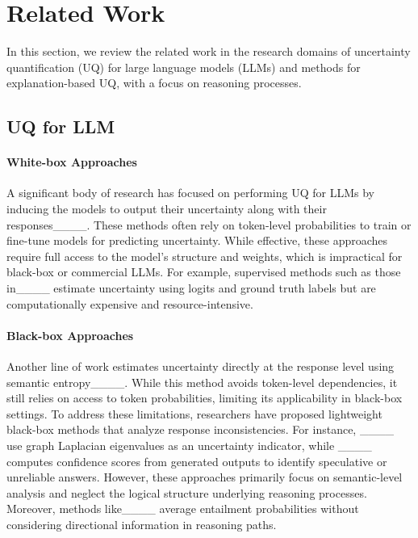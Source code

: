 \section{Related Work}

In this section, we review the related work in the research domains of uncertainty quantification (UQ) for large language models (LLMs) and methods for explanation-based UQ, with a focus on reasoning processes.



\subsection{UQ for LLM}

\paragraph{White-box Approaches} A significant body of research has focused on performing UQ for LLMs by inducing the models to output their uncertainty along with their responses____. These methods often rely on token-level probabilities to train or fine-tune models for predicting uncertainty. While effective, these approaches require full access to the model's structure and weights, which is impractical for black-box or commercial LLMs. For example, supervised methods such as those in____ estimate uncertainty using logits and ground truth labels but are computationally expensive and resource-intensive.
\paragraph{Black-box Approaches} Another line of work estimates uncertainty directly at the response level using semantic entropy____. While this method avoids token-level dependencies, it still relies on access to token probabilities, limiting its applicability in black-box settings. To address these limitations, researchers have proposed lightweight black-box methods that analyze response inconsistencies. For instance, ____ use graph Laplacian eigenvalues as an uncertainty indicator, while ____ computes confidence scores from generated outputs to identify speculative or unreliable answers. However, these approaches primarily focus on semantic-level analysis and neglect the logical structure underlying reasoning processes. Moreover, methods like____ average entailment probabilities without considering directional information in reasoning paths.


